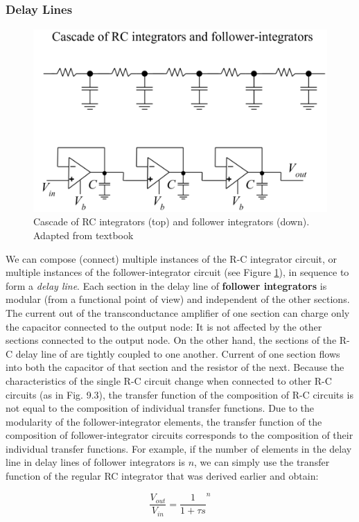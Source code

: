 \subsubsection{Delay Lines} 

\begin{figure}[H]
    \centering
    \includegraphics[width=0.65\linewidth]{../../Figures/Delay_Lines.PNG}
    \caption{Cascade of RC integrators (top) and follower integrators (down). Adapted from textbook}
    \label{fig:Delay_Lines}
\end{figure}

We can compose (connect) multiple instances of the R-C integrator circuit, or multiple instances of the follower-integrator circuit (see Figure \ref{fig:Delay_Lines}), in sequence to form a \textit{delay line}.
Each section in the delay line of \textbf{follower integrators} is modular (from a functional
point of view) and independent of the other sections. The current out of
the transconductance amplifier of one section can charge only the capacitor
connected to the output node: It is not affected by the other sections connected
to the output node. On the other hand, the sections of the R-C delay line of
are tightly coupled to one another. Current of one section flows into
both the capacitor of that section and the resistor of the next. Because the
characteristics of the single R-C circuit change when connected to other R-C
circuits (as in Fig. 9.3), the transfer function of the composition of R-C circuits
is not equal to the composition of individual transfer functions. Due to the modularity of the follower-integrator elements, the transfer function of the composition of follower-integrator circuits corresponds to the
composition of their individual transfer functions. For example, if the number of elements in the delay line in delay lines of follower integrators is $n$, we can simply use the transfer function of the regular RC integrator that was derived earlier and obtain: 

\begin{equation}
    \frac{V_{out}}{V_{in}} = \frac{1}{1 + \tau s}^n
\end{equation}


